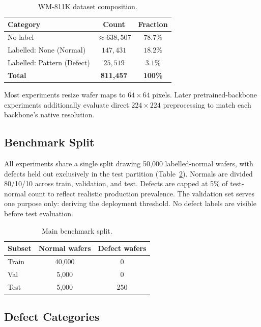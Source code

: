 \documentclass[11pt]{article}
\begin{document}
\begin{table}[H]
\centering
\caption{WM-811K dataset composition.}
\label{tab:dataset_distribution}
\begin{tabular}{lcc}
\toprule
Category & Count & Fraction \\
\midrule
No-label & ${\approx}638{,}507$ & $78.7\%$ \\
Labelled: None (Normal) & $147{,}431$ & $18.2\%$ \\
Labelled: Pattern (Defect) & $25{,}519$ & $3.1\%$ \\
\midrule
\textbf{Total} & \textbf{811,457} & \textbf{100\%} \\
\bottomrule
\end{tabular}
\end{table}

Most experiments resize wafer maps to $64\!\times\!64$ pixels. Later
pretrained-backbone experiments additionally evaluate direct $224\!\times\!224$
preprocessing to match each backbone's native resolution.

\subsection{Benchmark Split}

All experiments share a single split drawing 50,000 labelled-normal wafers,
with defects held out exclusively in the test partition (Table~\ref{tab:main_split}).
Normals are divided 80/10/10 across train, validation, and test.
Defects are capped at 5\% of test-normal count to reflect realistic production
prevalence. The validation set serves one purpose only: deriving the deployment
threshold. No defect labels are visible before test evaluation.

\begin{table}[H]
\centering
\caption{Main benchmark split.}
\label{tab:main_split}
\begin{tabular}{lcc}
\toprule
Subset & Normal wafers & Defect wafers \\
\midrule
Train   & 40{,}000 & 0   \\
Val     & 5{,}000  & 0   \\
Test    & 5{,}000  & 250 \\
\bottomrule
\end{tabular}
\end{table}

\subsection{Defect Categories}
\end{document}

